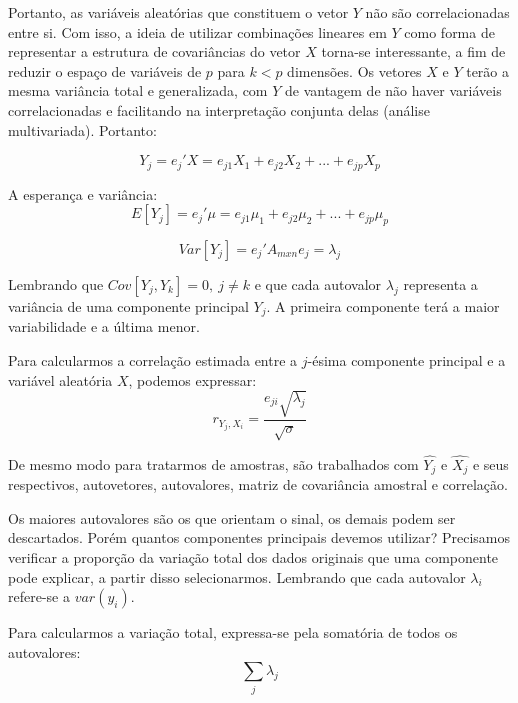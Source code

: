 \documentclass[
  openany]{book}
\begin{document}
Portanto, as variáveis aleatórias que constituem o vetor \(Y\) não são correlacionadas entre si. Com isso, a ideia de utilizar combinações lineares em \(Y\) como forma de representar a estrutura de covariâncias do vetor \(X\) torna-se interessante, a fim de reduzir o espaço de variáveis de \(p\) para \(k<p\) dimensões. Os vetores \(X\) e \(Y\) terão a mesma variância total e generalizada, com \(Y\) de vantagem de não haver variáveis correlacionadas e facilitando na interpretação conjunta delas (análise multivariada). Portanto:

\begin{equation}
   Y_j=e_j'X=e_{j1}X_1+e_{j2}X_2+...+e_{jp}X_p
   \label{eq:cp}
\end{equation}

A esperança e variância:
\begin{equation}
E[Y_j]=e_j'\mu=e_{j1}\mu_1+e_{j2}\mu_2+...+e_{jp}\mu_p
\end{equation}

\begin{equation}     
Var[Y_j]=e_j' A_{mxn}e_j=\lambda_j
\end{equation}

Lembrando que \(Cov[Y_j,Y_k]=0, \ j\neq k\) e que cada autovalor \(\lambda_j\) representa a variância de uma componente principal \(Y_j\). A primeira componente terá a maior variabilidade e a última menor.

Para calcularmos a correlação estimada entre a \(j\)-ésima componente principal e a variável aleatória \(X\), podemos expressar:
\begin{equation}   
r_{Y_j,X_i}=\frac{e_{ji}\sqrt{\lambda_j}}{\sqrt{\sigma}}
\end{equation}

De mesmo modo para tratarmos de amostras, são trabalhados com \(\hat{Y_j}\) e \(\hat{X_j}\) e seus respectivos, autovetores, autovalores, matriz de covariância amostral e correlação.

Os maiores autovalores são os que orientam o sinal, os demais podem ser descartados. Porém quantos componentes principais devemos utilizar? Precisamos verificar a proporção da variação total dos dados originais que uma componente pode explicar, a partir disso selecionarmos. Lembrando que cada autovalor \(\lambda_i\) refere-se a \(var(y_i)\).

Para calcularmos a variação total, expressa-se pela somatória de todos os autovalores:
\begin{equation}
    \displaystyle \sum_j \lambda_j 
    \label{eq:vartot}
\end{equation}
\end{document}
